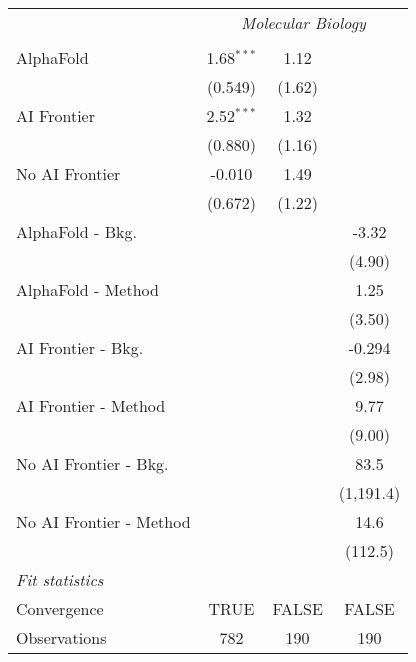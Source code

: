 \begin{tabular}{lccc}
 & \multicolumn{3}{c}{\textit{Molecular Biology}} \\ \\
   AlphaFold               & 1.68$^{***}$ & 1.12   &   \\   
                           & (0.549)      & (1.62) &   \\   
   AI Frontier             & 2.52$^{***}$ & 1.32   &   \\   
                           & (0.880)      & (1.16) &   \\   
   No AI Frontier          & -0.010       & 1.49   &   \\   
                           & (0.672)      & (1.22) &   \\   
   AlphaFold - Bkg.        &              &        & -3.32\\   
                           &              &        & (4.90)\\   
   AlphaFold - Method      &              &        & 1.25\\   
                           &              &        & (3.50)\\   
   AI Frontier - Bkg.      &              &        & -0.294\\   
                           &              &        & (2.98)\\   
   AI Frontier - Method    &              &        & 9.77\\   
                           &              &        & (9.00)\\   
   No AI Frontier - Bkg.   &              &        & 83.5\\   
                           &              &        & (1,191.4)\\   
   No AI Frontier - Method &              &        & 14.6\\   
                           &              &        & (112.5)\\   
   \midrule
   \emph{Fit statistics}\\
   Convergence             &TRUE          & FALSE  & FALSE\\  
   Observations            & 782          & 190    & 190\\  
   

\end{tabular}
